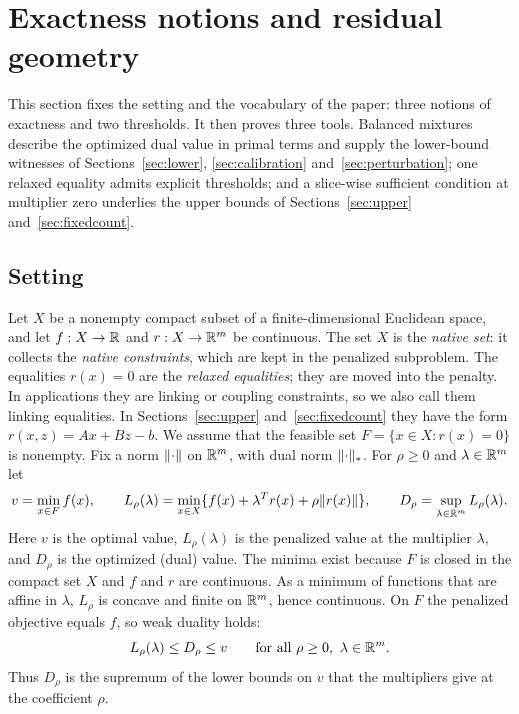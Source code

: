 \section{Exactness notions and residual geometry}\label{sec:geometry}
This section fixes the setting and the vocabulary of the paper: three
notions of exactness and two thresholds. It then proves three tools.
Balanced mixtures describe the optimized dual value in primal terms and
supply the lower-bound witnesses of Sections~\ref{sec:lower},
\ref{sec:calibration} and~\ref{sec:perturbation}; one relaxed equality
admits explicit thresholds; and a slice-wise sufficient condition at
multiplier zero underlies the upper bounds of Sections~\ref{sec:upper}
and~\ref{sec:fixedcount}.

\subsection{Setting}
Let $X$ be a nonempty compact subset of a finite-dimensional Euclidean
space, and let $f:X\to\mathbb R$ and $r:X\to\mathbb R^m$ be continuous. The set $X$
is the \emph{native set}: it collects the \emph{native constraints},
which are kept in the penalized subproblem. The equalities $r(x)=0$ are
the \emph{relaxed equalities}; they are moved into the penalty. In
applications they are linking or coupling constraints, so we also call
them linking equalities. In Sections~\ref{sec:upper}
and~\ref{sec:fixedcount} they have the form $r(x,z)=Ax+Bz-b$. We assume that the feasible set
$F=\{x\in X:r(x)=0\}$ is nonempty. Fix a norm $\lVert\cdot\rVert$ on $\mathbb R^m$,
with dual norm $\lVert\cdot\rVert_*$. For $\rho\ge0$ and $\lambda\in\mathbb R^m$ let
\begin{equation}\label{eq:model}
 v=\min_{x\in F}f(x),\qquad
 L_\rho(\lambda)=\min_{x\in X}\{f(x)+\lambda^Tr(x)+\rho\lVert r(x)\rVert\},
 \qquad D_\rho=\sup_{\lambda\in\mathbb R^m}L_\rho(\lambda).
\end{equation}
Here $v$ is the optimal value, $L_\rho(\lambda)$ is the penalized value
at the multiplier $\lambda$, and $D_\rho$ is the optimized (dual) value.
The minima exist because $F$ is closed in the compact set $X$ and $f$
and $r$ are continuous. As a minimum of functions that are affine in
$\lambda$, $L_\rho$ is concave and finite on $\mathbb R^m$, hence continuous.
On $F$ the penalized objective equals $f$, so weak duality holds:
\[
 L_\rho(\lambda)\le D_\rho\le v\qquad\text{for all }\rho\ge0,\ \lambda\in\mathbb R^m.
\]
Thus $D_\rho$ is the supremum of the lower bounds on $v$ that the
multipliers give at the coefficient $\rho$.

